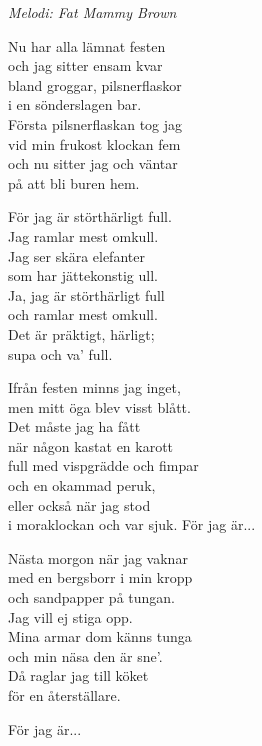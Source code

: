 {\footnotesize\textit{Melodi: Fat Mammy Brown}}\par
\vspace{10pt}
Nu har alla lämnat festen\\
och jag sitter ensam kvar\\
bland groggar, pilsnerflaskor\\
i en sönderslagen bar.\\
Första pilsnerflaskan tog jag\\
vid min frukost klockan fem\\
och nu sitter jag och väntar\\
på att bli buren hem.\par
\vspace{10pt}
För jag är störthärligt full.\\
Jag ramlar mest omkull.\\
Jag ser skära elefanter \\
som har jättekonstig ull.\\
Ja, jag är störthärligt full\\
och ramlar mest omkull.\\
Det är präktigt, härligt;\\
supa och va' full.\par
\vspace{10pt}
Ifrån festen minns jag inget,\\
men mitt öga blev visst blått.\\
Det måste jag ha fått\\
när någon kastat en karott\\
full med vispgrädde och fimpar\\
och en okammad peruk,\\
eller också när jag stod\\
i moraklockan och var sjuk.
\newpage
För jag är...\par
\vspace{10pt}
Nästa morgon när jag vaknar\\
med en bergsborr i min kropp\\
och sandpapper på tungan.\\
Jag vill ej stiga opp.\\
Mina armar dom känns tunga\\
och min näsa den är sne'.\\
Då raglar jag till köket\\
för en återställare.\par
\vspace{10pt}
För jag är...

